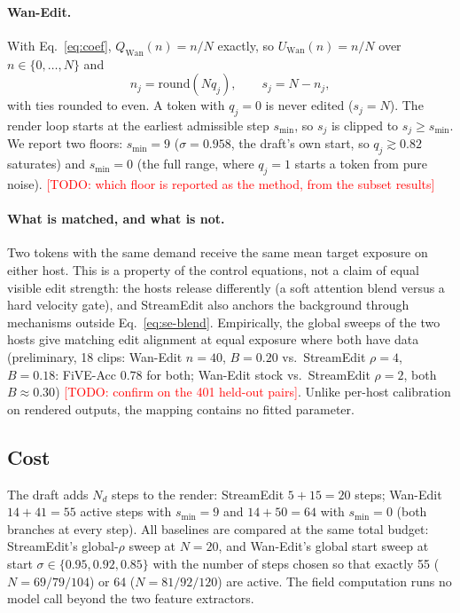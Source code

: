 \documentclass[10pt,twocolumn]{article}
\newcommand{\todo}[1]{\textcolor{red}{[TODO: #1]}}
\begin{document}
\paragraph{Wan-Edit.}
With Eq.~\eqref{eq:coef}, $Q_{\mathrm{Wan}}(n)=n/N$ exactly, so $U_{\mathrm{Wan}}(n)=n/N$ over $n\in\{0,\dots,N\}$ and
\begin{equation}
n_j = \mathrm{round}(N q_j),\qquad s_j = N - n_j,
\end{equation}
with ties rounded to even. A token with $q_j=0$ is never edited ($s_j=N$). The render loop starts at the earliest admissible step $s_{\min}$, so $s_j$ is clipped to $s_j\ge s_{\min}$. We report two floors: $s_{\min}=9$ ($\sigma=0.958$, the draft's own start, so $q_j\gtrsim0.82$ saturates) and $s_{\min}=0$ (the full range, where $q_j=1$ starts a token from pure noise). \todo{which floor is reported as the method, from the subset results}

\paragraph{What is matched, and what is not.}
Two tokens with the same demand receive the same mean target exposure on either host. This is a property of the control equations, not a claim of equal visible edit strength: the hosts release differently (a soft attention blend versus a hard velocity gate), and StreamEdit also anchors the background through mechanisms outside Eq.~\eqref{eq:se-blend}. Empirically, the global sweeps of the two hosts give matching edit alignment at equal exposure where both have data (preliminary, 18 clips: Wan-Edit $n=40$, $B=0.20$ vs.\ StreamEdit $\rho=4$, $B=0.18$: FiVE-Acc $0.78$ for both; Wan-Edit stock vs.\ StreamEdit $\rho=2$, both $B\approx0.30$) \todo{confirm on the 401 held-out pairs}. Unlike per-host calibration on rendered outputs, the mapping contains no fitted parameter.

\subsection{Cost}
\label{sec:cost}
The draft adds $N_d$ steps to the render: StreamEdit $5+15=20$ steps; Wan-Edit $14+41=55$ active steps with $s_{\min}=9$ and $14+50=64$ with $s_{\min}=0$ (both branches at every step). All baselines are compared at the same total budget: StreamEdit's global-$\rho$ sweep at $N=20$, and Wan-Edit's global start sweep at start $\sigma\in\{0.95,0.92,0.85\}$ with the number of steps chosen so that exactly 55 ($N=69/79/104$) or 64 ($N=81/92/120$) are active. The field computation runs no model call beyond the two feature extractors.
\end{document}
